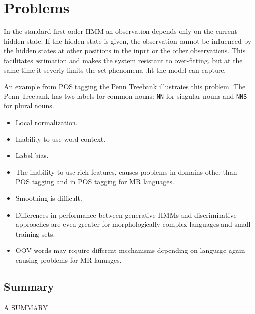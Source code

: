 \section{Problems}
In the standard first order HMM an observation depends only on the
current hidden state. If the hidden state is given, the observation
cannot be influenced by the hidden states at other positions in the
input or the other observations. This facilitates estimation and makes
the system resistant to over-fitting, but at the same time it severly
limits the set phenomena tht the model can capture.

An example from POS tagging the Penn Treebank illustrates this
problem. The Penn Treebank has two labels for common nouns: {\tt NN}
for singular nouns and {\tt NNS} for plural nouns.

\begin{itemize}
\item Local normalization.
\item Inability to use word context.
\item Label bias.
\item The inability to use rich features, causes problems in domains
  other than POS tagging and in POS tagging for MR languages.
\item Smoothing is difficult.
\item Differences in performance between generative HMMs and
  discriminative approaches are even greater for morphologically
  complex languages and small training sets.
\item OOV words may require different mechanisms depending on
  language again causing problems for MR lanuages.
\end{itemize}

\subsection{Summary}

A SUMMARY